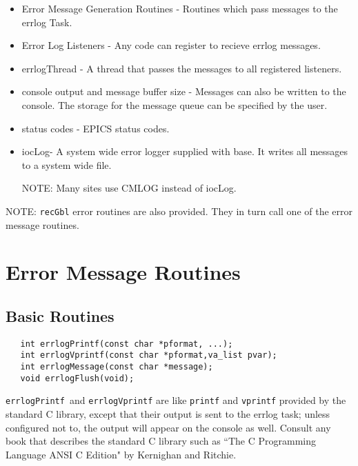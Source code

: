 \begin{itemize}\item Error Message Generation Routines - Routines which pass messages to the errlog Task.

\item Error Log Listeners - Any code can register to recieve errlog messages.

\item errlogThread - A thread that passes the messages to all registered listeners.

\item console output and message buffer size - Messages can also be written to the console. The storage for the message 
queue can be specified by the user.

\item status codes - EPICS status codes.

\item iocLog- A system wide error logger supplied with base. It writes all messages to a system wide file.

NOTE: Many sites use CMLOG instead of iocLog.

\end{itemize}NOTE: \verb|recGbl| error routines are also provided. They in turn call one of the error message routines.

\section{Error Message Routines}

\subsection{Basic Routines}

\begin{verbatim}   int errlogPrintf(const char *pformat, ...);
   int errlogVprintf(const char *pformat,va_list pvar);
   int errlogMessage(const char *message);
   void errlogFlush(void);
\end{verbatim}
 \verb|errlogPrintf |and  \verb|errlogVprintf| are like \verb|printf| and \verb|vprintf| provided by the standard C library, except 
that their output is sent to the errlog task; unless configured not to, the output will appear on the console as well. Consult 
any book that describes the standard C library such as ``The C Programming Language ANSI C Edition" by Kernighan 
and Ritchie.

